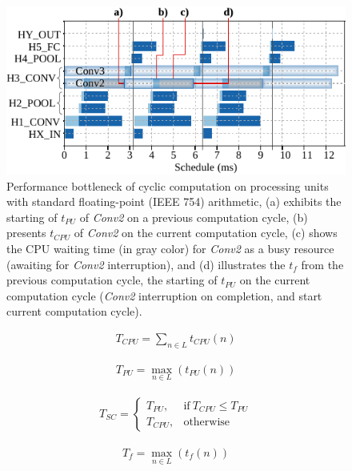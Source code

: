 \begin{figure}[t!]
	\centering
	\includegraphics[width=1\columnwidth]{../figures/latency_fp_cycle.pdf}
	\caption{Performance bottleneck of cyclic computation on processing units with standard floating-point (IEEE 754) arithmetic, (a) exhibits the starting of $t_{PU}$ of \emph{Conv2} on a previous computation cycle, (b) presents $t_{CPU}$ of \emph{Conv2} on the current computation cycle, (c) shows the CPU waiting time (in gray color) for \emph{Conv2} as a busy resource (awaiting for \emph{Conv2} interruption), and (d) illustrates the $t_{f}$ from the previous computation cycle, the starting of $t_{PU}$ on the current computation cycle (\emph{Conv2} interruption on completion, and start current computation cycle).}
	\label{fig:latency_pu_fp_cycle}
\end{figure}

\begin{eqnarray} \label{eq:time_cpu}
T_{CPU} = \sum_{n\in L} t_{CPU}(n)
\end{eqnarray}

\begin{eqnarray} \label{eq:time_pu}
T_{PU} = \max_{n\in L}(t_{PU}(n))
\end{eqnarray}

\begin{eqnarray} \label{eq:time_spike}
T_{SC} =
\begin{cases}
T_{PU}, & \text{if}\ T_{CPU}\le T_{PU} \\
T_{CPU}, & \text{otherwise}
\end{cases}
\end{eqnarray}

\begin{eqnarray} \label{eq:time_finish}
T_{f} = \max_{n\in L}(t_{f}(n))
\end{eqnarray}

